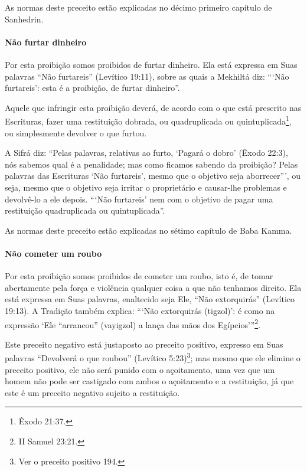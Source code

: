 As normas deste preceito estão explicadas no décimo primeiro capítulo de Sanhedrin.
  

\paragraph{Não furtar dinheiro}

Por esta proibição somos proibidos de furtar dinheiro. Ela está
expressa em Suas palavras ``Não furtareis'' (Levítico 19:11), sobre as
quais a Mekhiltá diz: ```Não furtareis': esta é a proibição, de furtar
dinheiro''.

Aquele que infringir esta proibição deverá, de acordo com o que está
prescrito nas Escrituras, fazer uma restituição dobrada, ou
quadruplicada ou quintuplicada\footnote{Êxodo 21:37.}, ou simplesmente
devolver o que furtou.

A Sifrá diz: ``Pelas palavras, relativas ao furto, `Pagará o dobro'
(Êxodo 22:3), nós sabemos qual é a penalidade; mas como ficamos sabendo
da proibição? Pelas palavras das Escrituras `Não furtareis', mesmo que
o objetivo seja aborrecer''', ou seja, mesmo que o objetivo seja irritar
o proprietário e causar-lhe problemas e devolvê-lo a ele depois. ```Não
furtareis' nem com o objetivo de pagar uma restituição quadruplicada ou
quintuplicada''.

As normas deste preceito estão explicadas no sétimo capítulo de Baba Kamma.

\paragraph{Não cometer um roubo}

Por esta proibição somos proibidos de cometer um roubo, isto é, de tomar
abertamente pela força e violência qualquer coisa a que não tenhamos
direito. Ela está expressa em Suas palavras, enaltecido seja Ele, ``Não
extorquirás'' (Levítico 19:13). A Tradição também explica: ```Não
extorquirás (tigzol)': é como na expressão `Ele ``arrancou'' (vayigzol)
a lança das mãos dos Egípcios'''\footnote{II Samuel 23:21.}.

Este preceito negativo está justaposto ao preceito positivo, expresso
em Suas palavras ``Devolverá o que roubou'' (Levítico
5:23)\footnote{Ver o preceito positivo 194.}; mas mesmo que ele elimine o preceito
positivo, ele não será punido com o açoitamento, uma vez que um homem
não pode ser castigado com ambos o açoitamento e a restituição, já que este é um preceito negativo sujeito a restituição.

